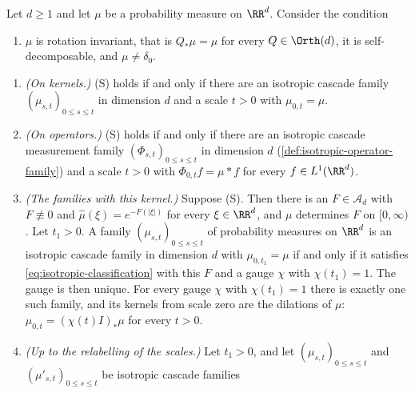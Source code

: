 \begin{theorem}
\label{cor:isotropic-scale-zero-kernels}
\leanok
Let $d \ge 1$ and let $\mu$ be a probability measure on $\RR^d$. Consider the condition
\begin{enumerate}
\item[(S)] $\mu$ is rotation invariant, that is $Q_*\mu = \mu$ for every $Q \in \Orth(d)$, it is
self-decomposable, and $\mu \ne \delta_0$.
\end{enumerate}
\begin{enumerate}
\item \emph{(On kernels.)} (S) holds if and only if there are an isotropic cascade family
$(\mu_{s,t})_{0 \le s \le t}$ in dimension $d$ and a scale $t > 0$ with $\mu_{0,t} = \mu$.
\item \emph{(On operators.)} (S) holds if and only if there are an isotropic cascade measurement
family $(\Phi_{s,t})_{0 \le s \le t}$ in dimension $d$ (\ref{def:isotropic-operator-family}) and
a scale $t > 0$ with $\Phi_{0,t}f = \mu * f$ for every $f \in L^1(\RR^d)$.
\item \emph{(The families with this kernel.)} Suppose (S). Then there is an $F \in \mathcal{A}_d$
with $F \not\equiv 0$ and $\widehat\mu(\xi) = e^{-F(|\xi|)}$ for every $\xi \in \RR^d$, and $\mu$
determines $F$ on $[0,\infty)$. Let $t_1 > 0$. A family $(\mu_{s,t})_{0 \le s \le t}$ of
probability measures on $\RR^d$ is an isotropic cascade family in dimension $d$ with
$\mu_{0,t_1} = \mu$ if and only if it satisfies \ref{eq:isotropic-classification} with this $F$
and a gauge $\chi$ with $\chi(t_1) = 1$. The gauge is then unique. For every gauge $\chi$ with
$\chi(t_1) = 1$ there is exactly one such family, and its kernels from scale zero are the
dilations of $\mu$: $\mu_{0,t} = (\chi(t)I)_*\mu$ for every $t > 0$.
\item \emph{(Up to the relabelling of the scales.)} Let $t_1 > 0$, and let
$(\mu_{s,t})_{0 \le s \le t}$ and $(\mu'_{s,t})_{0 \le s \le t}$ be isotropic cascade families

\end{enumerate}
\end{theorem}
